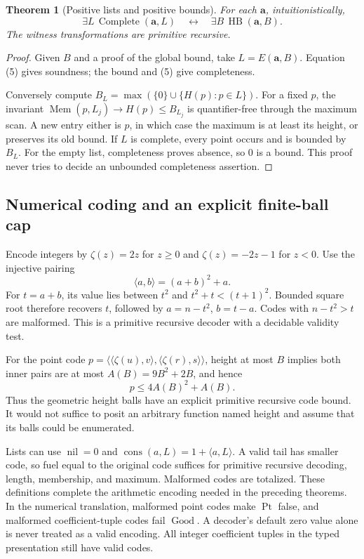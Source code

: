 \documentclass[11pt,letterpaper]{article}
\newcommand{\Good}{\operatorname{Good}}
\newcommand{\Pt}{\operatorname{Pt}}
\newcommand{\HB}{\operatorname{HB}}
\newcommand{\Comp}{\operatorname{Complete}}
\newtheorem{theorem}{Theorem}[section]
\theoremstyle{definition}
\begin{document}
\begin{theorem}[Positive lists and positive bounds]\label{thm:equiv}
For each $\mathbf a$, intuitionistically,
\[
 \exists L\,\Comp(\mathbf a,L)
             \quad\longleftrightarrow\quad
 \exists B\,\HB(\mathbf a,B).                              \tag{8}
\]
The witness transformations are primitive recursive.
\end{theorem}
\begin{proof}
Given $B$ and a proof of the global bound, take $L=E(\mathbf a,B)$.
Equation (5) gives soundness; the bound and (5) give completeness.

Conversely compute
$B_L=\max(\{0\}\cup\{H(p):p\in L\})$.
For a fixed $p$, the invariant
$\operatorname{Mem}(p,L_j)\to H(p)\leq B_{L_j}$ is quantifier-free
through the maximum scan. A new entry either is $p$, in which case the
maximum is at least its height, or preserves its old bound.
If $L$ is complete, every point occurs and is bounded by $B_L$.
For the empty list, completeness proves absence, so $0$ is a bound.
This proof never tries to decide an unbounded completeness assertion.
\end{proof}

\subsection{Numerical coding and an explicit finite-ball cap}
Encode integers by $\zeta(z)=2z$ for $z\geq0$ and
$\zeta(z)=-2z-1$ for $z<0$. Use the injective pairing
\[
                     \langle a,b\rangle=(a+b)^2+a.
\]
For $t=a+b$, its value lies between $t^2$ and $t^2+t<(t+1)^2$.
Bounded square root therefore recovers $t$, followed by
$a=n-t^2$, $b=t-a$. Codes with $n-t^2>t$ are malformed.
This is a primitive recursive decoder with a decidable validity test.

For the point code
$p=\langle\langle\zeta(u),v\rangle,\langle\zeta(r),s\rangle\rangle$,
height at most $B$ implies both inner pairs are at most
$A(B)=9B^2+2B$, and hence
\[
                        p\leq4A(B)^2+A(B).               \tag{9}
\]
Thus the geometric height balls have an explicit primitive recursive
code bound. It would not suffice to posit an arbitrary function named
height and assume that its balls could be enumerated.

Lists can use $\operatorname{nil}=0$ and
$\operatorname{cons}(a,L)=1+\langle a,L\rangle$.
A valid tail has smaller code, so fuel equal to the original code
suffices for primitive recursive decoding, length, membership, and
maximum. Malformed codes are totalized. These definitions complete the
arithmetic encoding needed in the preceding theorems.
In the numerical translation, malformed point codes make $\Pt$ false,
and malformed coefficient-tuple codes fail $\Good$. A decoder's default
zero value alone is never treated as a valid encoding. All integer
coefficient tuples in the typed presentation still have valid codes.
\end{document}
